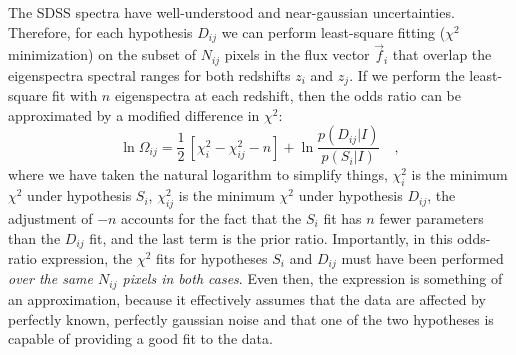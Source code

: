 \documentclass[12pt]{article}
\newcommand{\fluxvec}{\vec{f}}
\begin{document}
The SDSS spectra have well-understood and near-gaussian uncertainties.
Therefore, for each hypothesis $D_{ij}$ we can perform least-square
fitting ($\chi^2$ minimization) on the subset of $N_{ij}$ pixels in
the flux vector $\fluxvec_i$ that overlap the eigenspectra spectral
ranges for both redshifts $z_i$ and $z_j$.  If we perform the
least-square fit with $n$ eigenspectra at each redshift, then the odds
ratio can be approximated by a modified difference in $\chi^2$:
\begin{equation}
\ln\Omega_{ij}= \frac{1}{2}\,\left[\chi^2_i-\chi^2_{ij}-n\right]
 +\ln\frac{p(D_{ij}|I)}{p(S_i|I)} \quad,
\end{equation}
where we have taken the natural logarithm to simplify things,
$\chi^2_i$ is the minimum $\chi^2$ under hypothesis $S_i$,
$\chi^2_{ij}$ is the minimum $\chi^2$ under hypothesis $D_{ij}$, the
adjustment of $-n$ accounts for the fact that the $S_i$ fit has $n$
fewer parameters than the $D_{ij}$ fit, and the last term is the prior
ratio.  Importantly, in this odds-ratio expression, the $\chi^2$ fits
for hypotheses $S_i$ and $D_{ij}$ must have been performed \emph{over
the same $N_{ij}$ pixels in both cases}.  Even then, the expression is
something of an approximation, because it effectively assumes that the
data are affected by perfectly known, perfectly gaussian noise and
that one of the two hypotheses is capable of providing a good fit to
the data.
\end{document}
